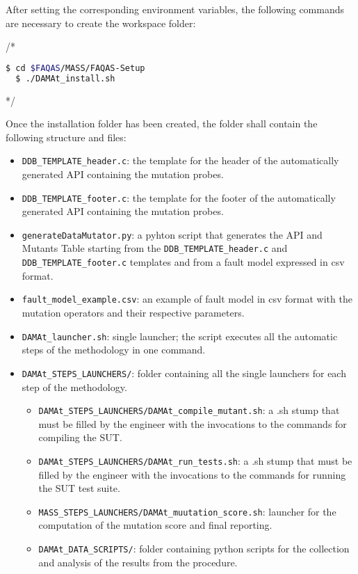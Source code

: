After setting the corresponding environment variables, the following commands are necessary to create the \DAMA workspace folder:

/* \begin{lstlisting}[language=bash]
  $ cd $FAQAS/MASS/FAQAS-Setup
  $ ./DAMAt_install.sh
\end{lstlisting} */

Once the installation folder has been created, the folder shall contain the following structure and files:

\begin{itemize}

  \item \texttt{DDB\_TEMPLATE\_header.c}: the template for the header of the automatically generated \DAMA API containing the mutation probes.
  \item \texttt{DDB\_TEMPLATE\_footer.c}: the template for the footer of the automatically generated \DAMA API containing the mutation probes.
  \item \texttt{generateDataMutator.py}: a pyhton script that generates the \DAMA API and Mutants Table starting from the \texttt{DDB\_TEMPLATE\_header.c} and \texttt{DDB\_TEMPLATE\_footer.c} templates and from a fault model expressed in csv format.
  \item \texttt{fault_model_example.csv}: an example of fault model in csv format with the \DAMA mutation operators and their respective parameters.
  \item \texttt{DAMAt\_launcher.sh}: \DAMA single launcher; the script executes all the automatic steps of the methodology in one command.
	\item \texttt{DAMAt\_STEPS\_LAUNCHERS/}: folder containing all the single launchers for each step of the \DAMA methodology.
	\begin{itemize}
		\item \texttt{DAMAt\_STEPS\_LAUNCHERS/DAMAt\_compile\_mutant.sh}: a .sh stump that must be filled by the engineer with the invocations to the commands for compiling the SUT.
		\item \texttt{DAMAt\_STEPS\_LAUNCHERS/DAMAt\_run\_tests.sh}: a .sh stump that must be filled by the engineer with the invocations to the commands for running the SUT test suite.
		\item \texttt{MASS\_STEPS\_LAUNCHERS/DAMAt_muutation_score.sh}: launcher for the computation of the mutation score and final reporting.
  \item \texttt{DAMAt\_DATA\_SCRIPTS/}: folder containing python scripts for the collection and analysis of the results from the \DAMA procedure.

\end{itemize}
\end{itemize}
